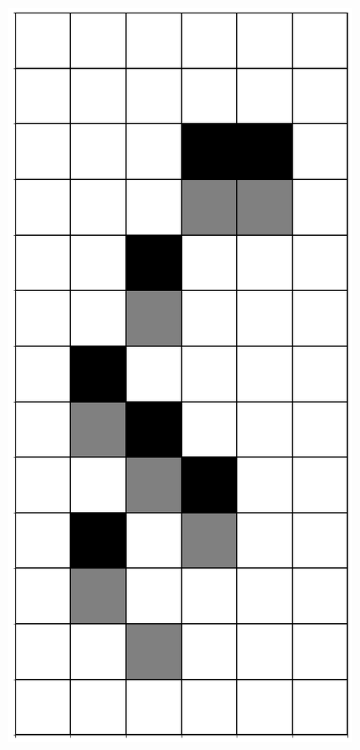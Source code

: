 \documentclass[12pt]{article}
\numberwithin{figure}{section} %
\begin{document}
\begin{figure}[H]
     	\begin{subfigure}{0.3\textwidth}
     		\centering
     		\includegraphics[angle=270,width=\linewidth]{Section4/11.1}

\end{subfigure}
\end{figure}
\end{document}
